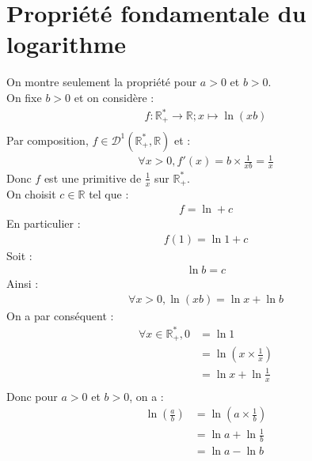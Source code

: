 \documentclass[../main.tex]{subfiles}
\begin{document}
\section{Propriété fondamentale du logarithme}
On montre seulement la propriété pour $a > 0$ et $b > 0$. \\
On fixe $b > 0$ et on considère : 
\begin{align*}
    f: \mathbb{R}_+^* \rightarrow \mathbb{R} ; x \mapsto \ln (xb) \\
\end{align*}
Par composition, $f \in \mathcal{D}^1(\mathbb{R}_+^*, \mathbb{R})$ et :
\begin{align*}
    \forall x > 0, f'(x) = b \times \frac{1}{xb} = \frac{1}{x}
\end{align*}
Donc $f$ est une primitive de $\frac{1}{x}$ sur $\mathbb{R}_+^*$. \\
On choisit $c \in \mathbb{R}$ tel que : \\
\begin{align*}
    f = \ln + c
\end{align*}
En particulier : 
\begin{align*}
    f(1) = \ln 1 + c
\end{align*}
Soit : 
\begin{align*}
    \ln b = c
\end{align*}
Ainsi : 
\begin{align*}
    \forall x > 0, \ln (xb) = \ln x + \ln b
\end{align*}
On a par conséquent :
\begin{align*}
    \forall x \in \mathbb{R}_+^*, 0 &= \ln 1 \\
    &= \ln (x \times \frac{1}{x}) \\
    &= \ln x + \ln \frac{1}{x} \\
\end{align*}
Donc pour $a > 0$ et $b > 0$, on a :
\begin{align*}
    \ln \left( \frac{a}{b} \right) &= \ln \left( a \times \frac{1}{b} \right) \\
    &= \ln a + \ln \frac{1}{b} \\
    &= \ln a - \ln b
\end{align*}
\end{document}
